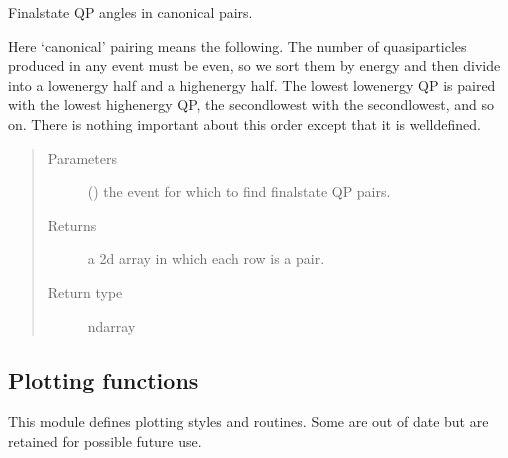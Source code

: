 \documentclass[letterpaper,10pt,english]{sphinxmanual}
\begin{document}
\begin{fulllineitems}
\label{\detokenize{analysis:scdc.analyze.qp_angle_pairs}}
Final\sphinxhyphen{}state QP angles in canonical pairs.

Here ‘canonical’ pairing means the following. The number of quasiparticles
produced in any event must be even, so we sort them by energy and then
divide into a low\sphinxhyphen{}energy half and a high\sphinxhyphen{}energy half. The lowest low\sphinxhyphen{}energy
QP is paired with the lowest high\sphinxhyphen{}energy QP, the second\sphinxhyphen{}lowest with the
second\sphinxhyphen{}lowest, and so on. There is nothing important about this order
except that it is well\sphinxhyphen{}defined.
\begin{quote}\begin{description}
\item[{Parameters}] \leavevmode
{} ({\hyperref[\detokenize{code_structure:scdc.event.Event}]{}}) \textendash{} the event for which to find final\sphinxhyphen{}state QP pairs.

\item[{Returns}] \leavevmode
a 2d array in which each row is a pair.

\item[{Return type}] \leavevmode
ndarray

\end{description}\end{quote}

\end{fulllineitems}



\subsection{Plotting functions}
\label{\detokenize{analysis:module-scdc.plot}}\label{\detokenize{analysis:plotting-functions}}
This module defines plotting styles and routines. Some are out of date
but are retained for possible future use.
\end{document}

